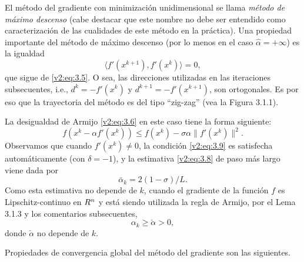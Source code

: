 El método del gradiente con minimización unidimensional se llama \textit{método de máximo descenso} (cabe destacar que este nombre no debe ser entendido como caracterización de las cualidades de este método en la práctica). Una propiedad importante del método de máximo descenso (por lo menos en el caso $\hat{\alpha} = +\infty$) es la igualdad
\[
    \langle f'(x^{k+1}), f'(x^k) \rangle = 0,
\]
que sigue de \eqref{v2:eq:3.5}. O sea, las direcciones utilizadas en las iteraciones subsecuentes, i.e., $d^k = -f'(x^k)$ y $d^{k+1} = -f'(x^{k+1})$, son ortogonales. Es por eso que la trayectoria del método es del tipo ``zig-zag'' (vea la Figura 3.1.1).

La desigualdad de Armijo \eqref{v2:eq:3.6} en este caso tiene la forma siguiente:
\[
    f(x^k - \alpha f'(x^k)) \le f(x^k) - \sigma \alpha \|f'(x^k)\|^2.
\]
Observamos que cuando $f'(x^k) \neq 0$, la condición \eqref{v2:eq:3.9} es satisfecha automáticamente (con $\delta = -1$), y la estimativa \eqref{v2:eq:3.8} de paso más largo viene dada por
\begin{equation}
    \bar{\alpha}_k = 2(1 - \sigma)/L.
    \label{v2:eq:3.19}
\end{equation}
Como esta estimativa no depende de $k$, cuando el gradiente de la función $f$ es Lipschitz-continuo en $R^n$ y está siendo utilizada la regla de Armijo, por el Lema 3.1.3 y los comentarios subsecuentes,
\begin{equation}
    \alpha_k \ge \check{\alpha} > 0,
    \label{v2:eq:3.20}
\end{equation}
donde $\check{\alpha}$ no depende de $k$.

Propiedades de convergencia global del método del gradiente son las siguientes.

